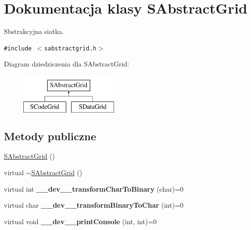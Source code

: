 \hypertarget{classSAbstractGrid}{
\section{Dokumentacja klasy SAbstractGrid}
\label{classSAbstractGrid}
}
Sbstrakcyjna siatka.  


{\tt \#include $<$sabstractgrid.h$>$}

Diagram dziedziczenia dla SAbstractGrid:\begin{figure}[H]
\begin{center}
\leavevmode
\includegraphics[height=2cm]{classSAbstractGrid}
\end{center}
\end{figure}
\subsection*{Metody publiczne}
\begin{CompactItemize}
\item 
\hyperlink{classSAbstractGrid_2df5b6a5bd2a11d9015104f3dd6afc20}{SAbstractGrid} ()
\item 
virtual \hyperlink{classSAbstractGrid_7391180cba323fbd0d64d23157c8a6a6}{$\sim$SAbstractGrid} ()
\item 
\hypertarget{classSAbstractGrid_1c10a9c322c321b3fc2c9a5195e817ba}{
virtual int \textbf{\_\-\_\-dev\_\-\_\-transformCharToBinary} (char)=0}
\label{classSAbstractGrid_1c10a9c322c321b3fc2c9a5195e817ba}

\item 
\hypertarget{classSAbstractGrid_6fc913c575c7d1b87b422084129db978}{
virtual char \textbf{\_\-\_\-dev\_\-\_\-transformBinaryToChar} (int)=0}
\label{classSAbstractGrid_6fc913c575c7d1b87b422084129db978}

\item 
\hypertarget{classSAbstractGrid_e36c03b21a96f33d1ace5fd0b1d218f5}{
virtual void \textbf{\_\-\_\-dev\_\-\_\-printConsole} (int, int)=0}
\label{classSAbstractGrid_e36c03b21a96f33d1ace5fd0b1d218f5}

\end{CompactItemize}
